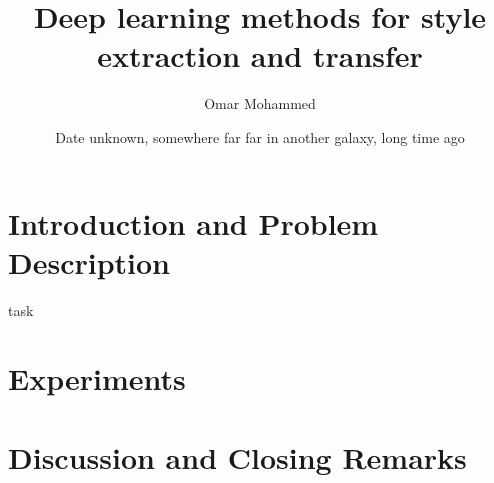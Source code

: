 \documentclass[12pt,a4paper,twoside, leqno]{book}
\title{Deep learning methods for style extraction and transfer}
\author{Omar Mohammed}
\date{Date unknown, somewhere far far in another galaxy, long time ago}
\begin{document}
\maketitle

\dominitoc%
\tableofcontents

\listoffigures

\listoftables

\part{Introduction and Problem Description}


\Gls{task}


\theendnotes
\setcounter{endnote}{0}

\part{Experiments}

\setcounter{endnote}{0}
\theendnotes


\setcounter{endnote}{0}
\theendnotes


\setcounter{endnote}{0}
\theendnotes

\part{Discussion and Closing Remarks}

\setcounter{endnote}{0}
\theendnotes


\setcounter{endnote}{0}
\theendnotes

\appendix

\setcounter{endnote}{0}
\theendnotes

\printglossaries

\printindex

% 
{\small }
\end{document}
